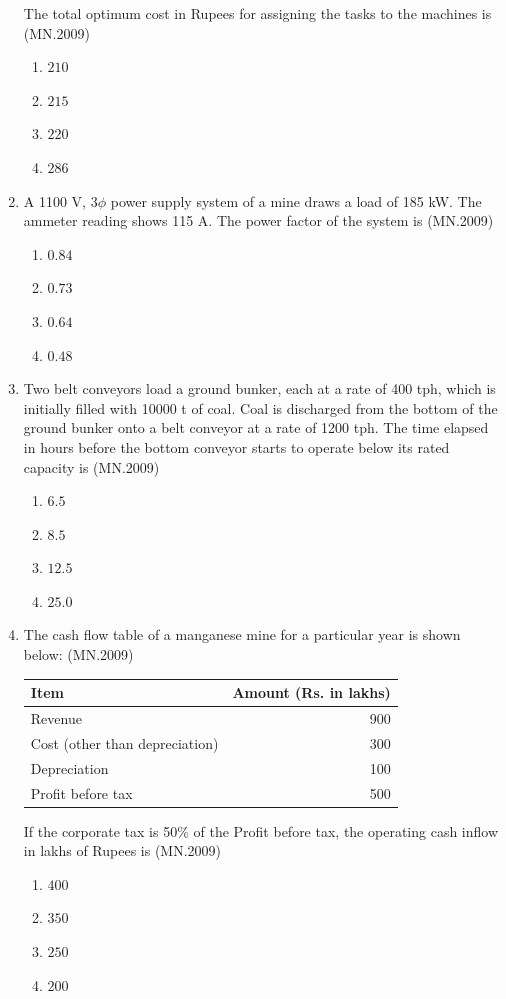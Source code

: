\documentclass[journal]{IEEEtran}
\numberwithin{equation}{enumi}
\numberwithin{figure}{enumi}
\begin{document}
\begin{enumerate}
The total optimum cost in Rupees for assigning the tasks to the machines is
\hfill{(MN.2009)}
\begin{enumerate}[label=(\Alph*)]
\item $210$
\item $215$
\item $220$
\item $286$
\end{enumerate}
\item A 1100 V, 3$\phi$ power supply system of a mine draws a load of 185 kW. The ammeter reading shows 115 A. The power factor of the system is
\hfill{(MN.2009)}
\begin{enumerate}[label=(\Alph*)]
\item $0.84$
\item $0.73$
\item $0.64$
\item $0.48$
\end{enumerate}

\item Two belt conveyors load a ground bunker, each at a rate of 400 tph, which is initially filled with 10000 t of coal. Coal is discharged from the bottom of the ground bunker onto a belt conveyor at a rate of 1200 tph. The time elapsed in hours before the bottom conveyor starts to operate below its rated capacity is
\hfill{(MN.2009)}
\begin{enumerate}[label=(\Alph*)]
\item $6.5$
\item $8.5$
\item $12.5$
\item $25.0$
\end{enumerate}

\item The cash flow table of a manganese mine for a particular year is shown below:
\hfill{(MN.2009)}
\begin{center}
\begin{tabular}{|l|r|}
\hline
\textbf{Item} & \textbf{Amount (Rs. in lakhs)} \\
\hline
Revenue & 900 \\
Cost (other than depreciation) & 300 \\
Depreciation & 100 \\
\hline
Profit before tax & 500 \\
\hline
\end{tabular}
\end{center}

If the corporate tax is 50\% of the Profit before tax, the operating cash inflow in lakhs of Rupees is
\hfill{(MN.2009)}
\begin{enumerate}[label=(\Alph*)]
\item $400$
\item $350$
\item $250$
\item $200$
\end{enumerate}


\end{enumerate}
\end{document}
